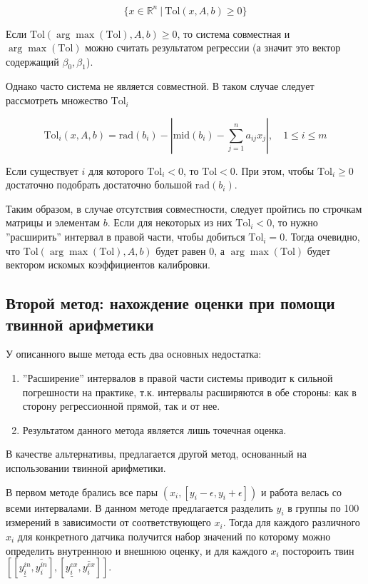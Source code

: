 \begin{equation}
    \{x \in \mathbb{R}^n \:|\: \text{Tol}(x, A, b) \geq 0\}
\end{equation}

Если $\text{Tol}(\arg\max(\text{Tol}), A, b) \geq 0$, то система совместная и $\arg\max(\text{Tol})$ можно считать результатом регрессии (а значит это вектор содержащий $\beta_0, \beta_1$).

Однако часто система не является совместной. В таком случае следует рассмотреть множество $\text{Tol}_i$

\begin{equation}
    \text{Tol}_i(x, A, b) = \text{rad}(b_i) - \left| \text{mid}(b_i) - \sum_{j=1}^{n}a_{ij}x_j \right|, \quad 1 \leq i \leq m
\end{equation}

Если существует $i$ для которого $\text{Tol}_i < 0$, то $\text{Tol} < 0$. При этом, чтобы $\text{Tol}_i \geq 0$ достаточно подобрать достаточно большой $\text{rad}(b_i)$.

Таким образом, в случае отсутствия совместности, следует пройтись по строчкам матрицы и элементам $b$. Если для некоторых из них $\text{Tol}_i < 0$, то нужно ''расширить'' интервал в правой части, чтобы добиться $\text{Tol}_i = 0$. Тогда очевидно, что $\text{Tol}(\arg\max(\text{Tol}), A, b)$ будет равен 0, а $\arg\max(\text{Tol})$ будет вектором искомых коэффициентов калибровки. 

\subsection{Второй метод: нахождение оценки при помощи твинной арифметики}
У описанного выше метода есть два основных недостатка:

\begin{enumerate}
    \item ''Расширение'' интервалов в правой части системы приводит к сильной погрешности на практике, т.к. интервалы расширяются в обе стороны: как в сторону регрессионной прямой, так и от нее.
    \item Результатом данного метода является лишь точечная оценка.
\end{enumerate}

В качестве альтернативы, предлагается другой метод, основанный на использовании твинной арифметики.

В первом методе брались все пары $(x_i, [y_i - \epsilon, y_i + \epsilon])$ и работа велась со всеми интервалами. В данном методе предлагается разделить $y_i$ в группы по 100 измерений в зависимости от соответствующего $x_i$. Тогда для каждого различного $x_i$ для конкретного датчика получится набор значений по которому можно определить внутреннюю и внешнюю оценку, и для каждого $x_i$ постороить твин $[[\underline{y_{i}^{in}}, \overline{y_{i}^{in}}], [\underline{y_{i}^{ex}}, \overline{y_{i}^{ex}}]]$.

